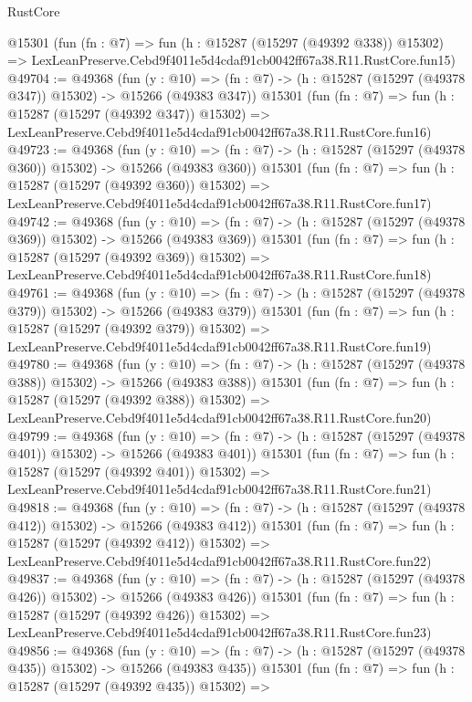 \begin{lexlean}{RustCore}
\begin{coremodule}
    @15301
    (fun (fn : @7) =>
    fun (h : @15287 (@15297 (@49392 @338)) @15302) =>
    LexLeanPreserve.Cebd9f4011e5d4cdaf91cb0042ff67a38.R11.RustCore.fun15)
@49704 := @49368
    (fun (y : @10) =>
    (fn : @7) -> (h : @15287 (@15297 (@49378 @347)) @15302) -> @15266 (@49383 @347))
    @15301
    (fun (fn : @7) =>
    fun (h : @15287 (@15297 (@49392 @347)) @15302) =>
    LexLeanPreserve.Cebd9f4011e5d4cdaf91cb0042ff67a38.R11.RustCore.fun16)
@49723 := @49368
    (fun (y : @10) =>
    (fn : @7) -> (h : @15287 (@15297 (@49378 @360)) @15302) -> @15266 (@49383 @360))
    @15301
    (fun (fn : @7) =>
    fun (h : @15287 (@15297 (@49392 @360)) @15302) =>
    LexLeanPreserve.Cebd9f4011e5d4cdaf91cb0042ff67a38.R11.RustCore.fun17)
@49742 := @49368
    (fun (y : @10) =>
    (fn : @7) -> (h : @15287 (@15297 (@49378 @369)) @15302) -> @15266 (@49383 @369))
    @15301
    (fun (fn : @7) =>
    fun (h : @15287 (@15297 (@49392 @369)) @15302) =>
    LexLeanPreserve.Cebd9f4011e5d4cdaf91cb0042ff67a38.R11.RustCore.fun18)
@49761 := @49368
    (fun (y : @10) =>
    (fn : @7) -> (h : @15287 (@15297 (@49378 @379)) @15302) -> @15266 (@49383 @379))
    @15301
    (fun (fn : @7) =>
    fun (h : @15287 (@15297 (@49392 @379)) @15302) =>
    LexLeanPreserve.Cebd9f4011e5d4cdaf91cb0042ff67a38.R11.RustCore.fun19)
@49780 := @49368
    (fun (y : @10) =>
    (fn : @7) -> (h : @15287 (@15297 (@49378 @388)) @15302) -> @15266 (@49383 @388))
    @15301
    (fun (fn : @7) =>
    fun (h : @15287 (@15297 (@49392 @388)) @15302) =>
    LexLeanPreserve.Cebd9f4011e5d4cdaf91cb0042ff67a38.R11.RustCore.fun20)
@49799 := @49368
    (fun (y : @10) =>
    (fn : @7) -> (h : @15287 (@15297 (@49378 @401)) @15302) -> @15266 (@49383 @401))
    @15301
    (fun (fn : @7) =>
    fun (h : @15287 (@15297 (@49392 @401)) @15302) =>
    LexLeanPreserve.Cebd9f4011e5d4cdaf91cb0042ff67a38.R11.RustCore.fun21)
@49818 := @49368
    (fun (y : @10) =>
    (fn : @7) -> (h : @15287 (@15297 (@49378 @412)) @15302) -> @15266 (@49383 @412))
    @15301
    (fun (fn : @7) =>
    fun (h : @15287 (@15297 (@49392 @412)) @15302) =>
    LexLeanPreserve.Cebd9f4011e5d4cdaf91cb0042ff67a38.R11.RustCore.fun22)
@49837 := @49368
    (fun (y : @10) =>
    (fn : @7) -> (h : @15287 (@15297 (@49378 @426)) @15302) -> @15266 (@49383 @426))
    @15301
    (fun (fn : @7) =>
    fun (h : @15287 (@15297 (@49392 @426)) @15302) =>
    LexLeanPreserve.Cebd9f4011e5d4cdaf91cb0042ff67a38.R11.RustCore.fun23)
@49856 := @49368
    (fun (y : @10) =>
    (fn : @7) -> (h : @15287 (@15297 (@49378 @435)) @15302) -> @15266 (@49383 @435))
    @15301
    (fun (fn : @7) =>
    fun (h : @15287 (@15297 (@49392 @435)) @15302) =>

\end{coremodule}
\end{lexlean}
